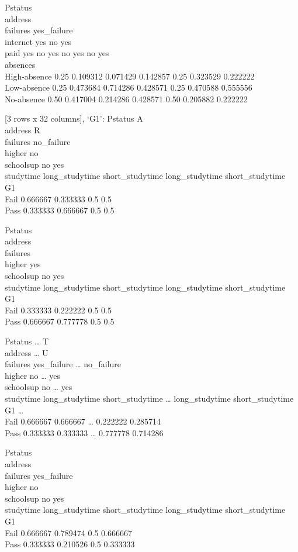 \documentclass[
]{article}
\begin{document}
Pstatus\\
address\\
failures yes\_failure\\
internet yes no yes\\
paid yes no yes no yes no yes\\
absences\\
High-absence 0.25 0.109312 0.071429 0.142857 0.25 0.323529 0.222222\\
Low-absence 0.25 0.473684 0.714286 0.428571 0.25 0.470588 0.555556\\
No-absence 0.50 0.417004 0.214286 0.428571 0.50 0.205882 0.222222

{[}3 rows x 32 columns{]}, `G1': Pstatus A\\
address R\\
failures no\_failure\\
higher no\\
schoolsup no yes\\
studytime long\_studytime short\_studytime long\_studytime
short\_studytime\\
G1\\
Fail 0.666667 0.333333 0.5 0.5\\
Pass 0.333333 0.666667 0.5 0.5

Pstatus\\
address\\
failures\\
higher yes\\
schoolsup no yes\\
studytime long\_studytime short\_studytime long\_studytime
short\_studytime\\
G1\\
Fail 0.333333 0.222222 0.5 0.5\\
Pass 0.666667 0.777778 0.5 0.5

Pstatus \ldots{} T\\
address \ldots{} U\\
failures yes\_failure \ldots{} no\_failure\\
higher no \ldots{} yes\\
schoolsup no \ldots{} yes\\
studytime long\_studytime short\_studytime \ldots{} long\_studytime
short\_studytime\\
G1 \ldots{}\\
Fail 0.666667 0.666667 \ldots{} 0.222222 0.285714\\
Pass 0.333333 0.333333 \ldots{} 0.777778 0.714286

Pstatus\\
address\\
failures yes\_failure\\
higher no\\
schoolsup no yes\\
studytime long\_studytime short\_studytime long\_studytime
short\_studytime\\
G1\\
Fail 0.666667 0.789474 0.5 0.666667\\
Pass 0.333333 0.210526 0.5 0.333333
\end{document}

